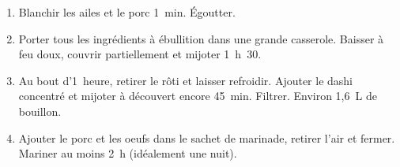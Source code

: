 
\begin{ingredients}
\end{ingredients}

\begin{recipe}
  \begin{enumerate}

  \item Blanchir les ailes et le porc 1~min. Égoutter.

  \item Porter tous les ingrédients à ébullition dans une grande
    casserole. Baisser à feu doux, couvrir partiellement et mijoter
    1~h~30.

  \item Au bout d'1~heure, retirer le rôti et laisser refroidir.
    Ajouter le dashi concentré et mijoter à découvert encore 45~min.
    Filtrer. Environ 1,6~L de bouillon.

  \item Ajouter le porc et les oeufs dans le sachet de marinade, retirer
    l'air et fermer. Mariner au moins 2~h (idéalement une nuit).

  \end{enumerate}
\end{recipe}

